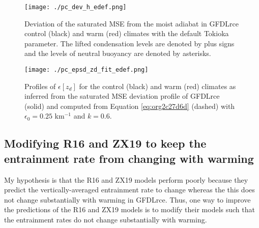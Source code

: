 \documentclass[11pt]{article}
\begin{document}
\begin{figure}[htbp]
\centering
\texttt{[image: ./pc\_dev\_h\_edef.png]}
\caption{\label{fig:org5ed57dd}Deviation of the saturated MSE from the moist adiabat in GFDLrce control (black) and warm (red) climates with the default Tokioka parameter. The lifted condensation levels are denoted by plus signs and the levels of neutral buoyancy are denoted by asterisks.}
\end{figure}

\begin{figure}[htbp]
\centering
\texttt{[image: ./pc\_epsd\_zd\_fit\_edef.png]}
\caption{\label{fig:org646e7c8}Profiles of \(\epsilon[z_d]\) for the control (black) and warm (red) climates as inferred from the saturated MSE deviation profile of GFDLrce (solid) and computed from Equation \ref{eq:org2c27d6d} (dashed) with \(\epsilon_0=0.25\) km\(^{-1}\) and \(k=0.6\).}
\end{figure}

\subsection*{Modifying R16 and ZX19 to keep the entrainment rate from changing with warming}
\label{sec:orgb33d625}
My hypothesis is that the R16 and ZX19 models perform poorly because they predict the vertically-averaged entrainment rate to change whereas the this does not change substantially with warming in GFDLrce. Thus, one way to improve the predictions of the R16 and ZX19 models is to modify their models such that the entrainment rates do not change substantially with warming.
\end{document}
